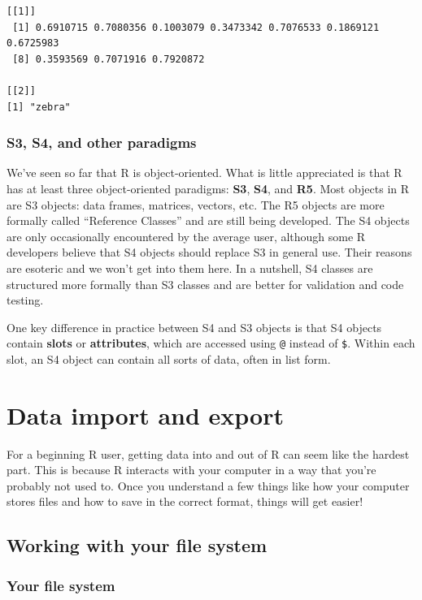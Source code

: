 \documentclass[
  13,
  letterpaper,
]{report}
\begin{document}
\begin{verbatim}
[[1]]
 [1] 0.6910715 0.7080356 0.1003079 0.3473342 0.7076533 0.1869121 0.6725983
 [8] 0.3593569 0.7071916 0.7920872

[[2]]
[1] "zebra"
\end{verbatim}

\subsection{S3, S4, and other paradigms}\label{sec-object-struct-other}

We've seen so far that R is object-oriented. What is little appreciated
is that R has at least three object-oriented paradigms: \textbf{S3},
\textbf{S4}, and \textbf{R5}. Most objects in R are S3 objects: data
frames, matrices, vectors, etc. The R5 objects are more formally called
``Reference Classes'' and are still being developed. The S4 objects are
only occasionally encountered by the average user, although some R
developers believe that S4 objects should replace S3 in general use.
Their reasons are esoteric and we won't get into them here. In a
nutshell, S4 classes are structured more formally than S3 classes and
are better for validation and code testing.

One key difference in practice between S4 and S3 objects is that S4
objects contain \textbf{slots} or \textbf{attributes}, which are
accessed using \texttt{@} instead of \texttt{\$}. Within each slot, an
S4 object can contain all sorts of data, often in list form.

\chapter{Data import and export}\label{sec-ie}

For a beginning R user, getting data into and out of R can seem like the
hardest part. This is because R interacts with your computer in a way
that you're probably not used to. Once you understand a few things like
how your computer stores files and how to save in the correct format,
things will get easier!

\section{Working with your file system}\label{sec-ie-files}

\subsection{Your file system}\label{sec-ie-files-your}
\end{document}
